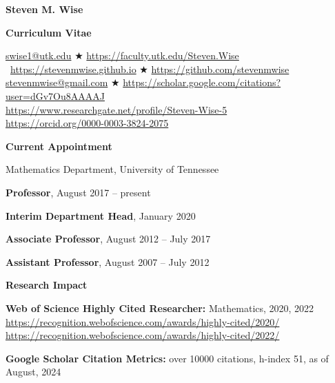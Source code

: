 \documentclass[11pt]{letter}
\begin{document}
    
    \begin{center}
    
{\Huge\bf  Steven M. Wise}

{\Large\bf  Curriculum Vitae}


\url{swise1@utk.edu}  $\bigstar$  \url{https://faculty.utk.edu/Steven.Wise}
	\
\url{https://stevenmwise.github.io}  $\bigstar$    \url{https://github.com/stevenmwise}
	\\
\url{stevenmwise@gmail.com}  $\bigstar$   \url{https://scholar.google.com/citations?user=dGv7Ou8AAAAJ}
	\\
\url{https://www.researchgate.net/profile/Steven-Wise-5}
	\\
\url{https://orcid.org/0000-0003-3824-2075}
    \end{center}

    \medskip

{\LARGE\bf  Current Appointment}
    \begin{description}
    \item
Mathematics Department, University of Tennessee
	\begin{description}
	\item
\textbf{Professor}, August 2017 -- present
	\item
\textbf{Interim Department Head}, January 2020
	\item
\textbf{Associate Professor}, August 2012 -- July 2017
	\item
\textbf{Assistant Professor}, August 2007 -- July 2012
	\end{description}
	\end{description}
	
	\smallskip
	
{\LARGE\bf  Research Impact}
    \begin{description}
    \item
\textbf{Web of Science Highly Cited Researcher:} Mathematics, 2020, 2022
	\\
\url{https://recognition.webofscience.com/awards/highly-cited/2020/}
	\\
\url{https://recognition.webofscience.com/awards/highly-cited/2022/}
   	\item
\textbf{Google Scholar Citation Metrics:} over 10000 citations, h-index 51, as of August, 2024
    \end{description}
    
    \smallskip
	
\end{document}
